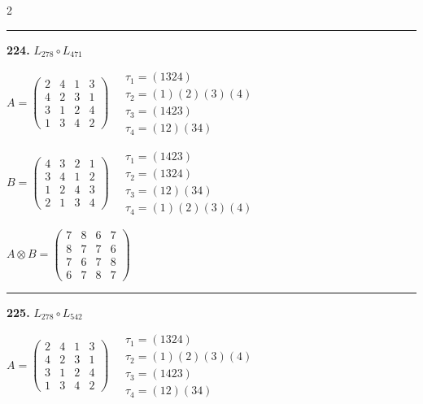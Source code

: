 \begin{multicols}{2}
\vspace{0.3em}
\hrule
\vspace{0.3em}

\noindent\textbf{224.} $L_{278} \circ L_{471}$

$A = \begin{pmatrix} 2 & 4 & 1 & 3 \\ 4 & 2 & 3 & 1 \\ 3 & 1 & 2 & 4 \\ 1 & 3 & 4 & 2 \end{pmatrix} \quad \begin{matrix} \tau_{1}=(1 3 2 4) \\ \tau_{2}=(1)(2)(3)(4) \\ \tau_{3}=(1 4 2 3) \\ \tau_{4}=(1 2)(3 4) \end{matrix}$

$B = \begin{pmatrix} 4 & 3 & 2 & 1 \\ 3 & 4 & 1 & 2 \\ 1 & 2 & 4 & 3 \\ 2 & 1 & 3 & 4 \end{pmatrix} \quad \begin{matrix} \tau_{1}=(1 4 2 3) \\ \tau_{2}=(1 3 2 4) \\ \tau_{3}=(1 2)(3 4) \\ \tau_{4}=(1)(2)(3)(4) \end{matrix}$

$A \otimes B = \begin{pmatrix} 7 & 8 & 6 & 7 \\ 8 & 7 & 7 & 6 \\ 7 & 6 & 7 & 8 \\ 6 & 7 & 8 & 7 \end{pmatrix}$

\vspace{0.3em}
\hrule
\vspace{0.3em}

\noindent\textbf{225.} $L_{278} \circ L_{542}$

$A = \begin{pmatrix} 2 & 4 & 1 & 3 \\ 4 & 2 & 3 & 1 \\ 3 & 1 & 2 & 4 \\ 1 & 3 & 4 & 2 \end{pmatrix} \quad \begin{matrix} \tau_{1}=(1 3 2 4) \\ \tau_{2}=(1)(2)(3)(4) \\ \tau_{3}=(1 4 2 3) \\ \tau_{4}=(1 2)(3 4) \end{matrix}$


\end{multicols}
